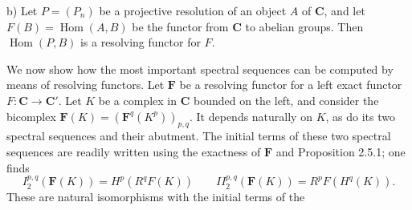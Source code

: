 b) Let $P=(P_n)$ be a projective resolution of an object $A$ of
$\mathbf{C}$, and let $F(B)=\operatorname{Hom}(A,B)$ be the functor from $\mathbf{C}$ to
abelian groups. Then $\operatorname{Hom}(P,B)$ is a resolving functor for
$F$.

We now show how the most important spectral sequences can be computed by
means of resolving functors. Let $\mathbf F$ be a resolving functor for a
left exact functor $F:\mathbf{C}\to \mathbf{C}'$. Let $K$ be a complex in $\mathbf{C}$
bounded on the left, and consider the bicomplex
$\mathbf F(K)=(\mathbf F^q(K^p))_{p,q}$. It depends naturally on $K$, as do
its two spectral sequences and their abutment. The initial terms of these two spectral sequences are readily written using the exactness of
$\mathbf F$ and Proposition 2.5.1; one finds
\[
\tag{2.5.3}
I_2^{p,q}(\mathbf F(K))=H^p(R^qF(K))
\qquad
II_2^{p,q}(\mathbf F(K))=R^pF(H^q(K)).
\]
These are natural isomorphisms with the initial terms of the

